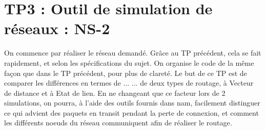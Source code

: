 \chapter{TP3 : Outil de simulation de réseaux : NS-2}
    On commence par réaliser le réseau demandé. Grâce au TP précédent, cela se fait rapidement, et selon les spécifications du sujet. On organise le code de la même façon que dans le TP précédent, pour plus de clareté. Le but de ce TP est de comparer les différences en termes de ... ... de deux types de routage, à Vecteur de distance et à Etat de lien. En ne changeant que ce facteur lors de 2 simulations, on pourra, à l'aide des outils fournis dans nam, facilement distinguer ce qui advient des paquets en transit pendant la perte de connexion, et comment les différents noeuds du réseau communiquent afin de réaliser le routage.

